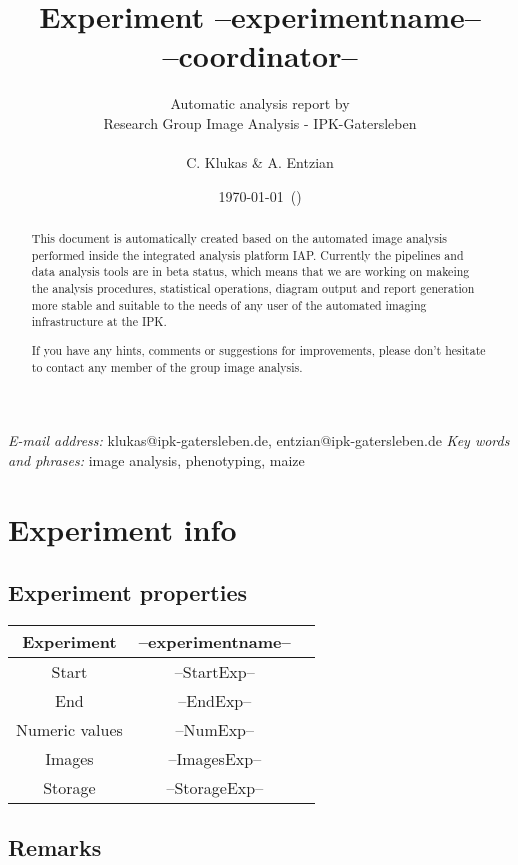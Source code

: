 \documentclass[%
  paper=a4, %
  pagesize, %
  DIV=calc, %
  headings=small,%
  english,   %
  oneside
]{scrartcl}  %
\providecommand{\tabularnewline}{\\}
\begin{document}
\title{Experiment --experimentname-- \\ \large{--coordinator--}}

\author{Automatic analysis report by\tabularnewline Research
Group Image Analysis - IPK-Gatersleben\tabularnewline \tabularnewline C. Klukas
\& A. Entzian}

\date{\today ~(\currenttime )}

\maketitle
\thispagestyle{empty}  
\begin{abstract}
This document is automatically created based on the automated image analysis performed 
inside the integrated analysis platform IAP. Currently the pipelines and data analysis tools are in beta status, 
which means that we are working on makeing the analysis procedures, statistical operations, diagram output and report
generation more stable and suitable to the needs of any user of the automated imaging infrastructure at the IPK.

If you have any hints, comments or suggestions for improvements, please don't hesitate to contact any member
of the group image analysis.
\end{abstract}
\vfill
\small{\textit{E-mail address:} klukas@ipk-gatersleben.de, entzian@ipk-gatersleben.de}
\newline 
\small{\textit{Key words and phrases:} image analysis, phenotyping, maize }
 

\clearpage
\tableofcontents

\clearpage
\pagestyle{headings}
\section{Experiment info} 
\subsection{Experiment properties}


\begin{tabular}{|c|c|c|}
\hline 
Experiment & --experimentname--\tabularnewline
\hline 
\hline 
Start & --StartExp--\tabularnewline
\hline 
End & --EndExp--\tabularnewline
\hline 
Numeric values & --NumExp-- \tabularnewline
\hline 
Images & --ImagesExp-- \tabularnewline
\hline 
Storage & --StorageExp-- \tabularnewline
\hline 
\end{tabular}


\subsection{Remarks}
\end{document}
